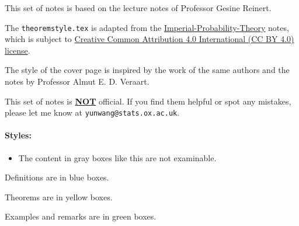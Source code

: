 \thispagestyle{empty}
This set of notes is based on the lecture notes of Professor Gesine Reinert.

The \verb|theoremstyle.tex| is adapted from the \href{https://github.com/Samuel-CHLam/Imperial-Probability-Theory}{Imperial-Probability-Theory} notes, which is subject to \href{https://github.com/Samuel-CHLam/Imperial-Probability-Theory#license}{Creative Common Attribution 4.0 International (CC BY 4.0) license}.  

The style of the cover page is inspired by the work of the same authors and the notes by Professor Almut E. D. Veraart.


This set of notes is \underline{\bf NOT} official. If you find them helpful or spot any mistakes, please let me know at \verb|yunwang@stats.ox.ac.uk|.

\paragraph{Styles:}
\begin{unexaminable}
\begin{itemize}
    \item The content in gray boxes like this are not examinable.
\end{itemize}
\end{unexaminable}  
 
\begin{definition}
    Definitions are in blue boxes.
\end{definition}
\begin{theorem}
    Theorems are in yellow boxes.
\end{theorem}

\begin{example}
    Examples and remarks are in green boxes. 
\end{example}



